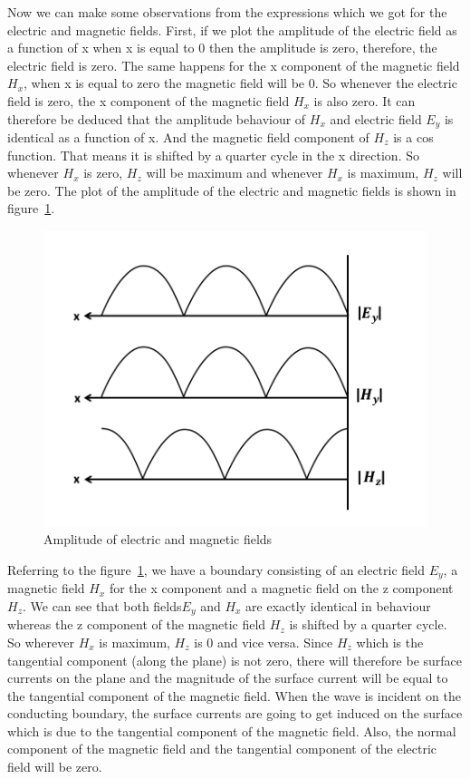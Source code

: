Now we can make some observations from the expressions which we got for the electric and magnetic fields. First, if we plot the amplitude of the electric field as a function of x when x is equal to 0 then the amplitude is zero, therefore, the electric field is zero. The same happens for the x component of the magnetic field $H_x$, when x is equal to zero the magnetic field will be 0. So whenever the electric field is zero, the x component of the magnetic field $H_x$ is also zero. It can therefore be deduced that the amplitude behaviour of $H_x$ and electric field $E_y$ is identical as a function of x. And the magnetic field component of $H_z$ is a cos function. That means it is shifted by a quarter cycle in the x direction. So whenever $H_x$ is zero, $H_z$ will be maximum and whenever $H_x$ is maximum, $H_z$ will be zero. The plot of the amplitude of the electric and magnetic fields is shown in figure~\ref{fig:amplitude}.
\begin{figure}[h]
\centering
\includegraphics[width=1\linewidth]{graphics/amplitude_of_electric_and_magnetic_fields.png}
\caption{Amplitude of electric and magnetic fields}
\label{fig:amplitude}
\end{figure}

Referring to the figure~\ref{fig:amplitude}, we have a boundary consisting of an electric field $E_y$, a magnetic field $H_x$ for the x component and a magnetic field on the z component $H_z$. We can see that both fields$ E_y$ and $H_x$ are exactly identical in behaviour whereas the z component of the magnetic field $H_z$ is shifted by a quarter cycle. So wherever $H_x$ is maximum, $H_z$ is 0 and vice versa. Since $H_z$ which is the tangential component (along the plane) is not zero, there will therefore be surface currents on the plane and the magnitude of the surface current will be equal to the tangential component of the magnetic field. When the wave is incident on the conducting boundary, the surface currents are going to get induced on the surface which is due to the tangential component of the magnetic field. Also, the normal component of the magnetic field and the tangential component of the electric field will be zero.

